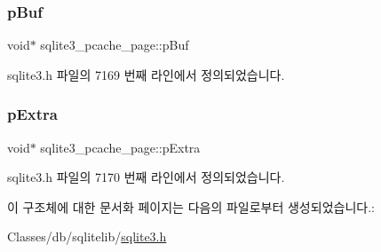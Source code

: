 \subsubsection{\texorpdfstring{p\+Buf}{pBuf}}
{\footnotesize\ttfamily void$\ast$ sqlite3\+\_\+pcache\+\_\+page\+::p\+Buf}



sqlite3.\+h 파일의 7169 번째 라인에서 정의되었습니다.

\mbox{\label{structsqlite3__pcache__page_a6356a15fc426a7558ddf34038f70a65f}} 
\subsubsection{\texorpdfstring{p\+Extra}{pExtra}}
{\footnotesize\ttfamily void$\ast$ sqlite3\+\_\+pcache\+\_\+page\+::p\+Extra}



sqlite3.\+h 파일의 7170 번째 라인에서 정의되었습니다.



이 구조체에 대한 문서화 페이지는 다음의 파일로부터 생성되었습니다.\+:\begin{DoxyCompactItemize}
\item 
Classes/db/sqlitelib/\hyperlink{sqlite3_8h}{sqlite3.\+h}\end{DoxyCompactItemize}
